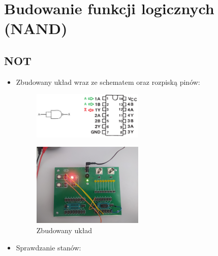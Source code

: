 \chapter{Budowanie funkcji logicznych (NAND)}

    \section{NOT}
        \begin{itemize}
            \item Zbudowany układ wraz ze schematem oraz rozpiską pinów:
                \begin{figure}[H]
                    \centering
                    \includegraphics[width=0.5\textwidth]{img/schemes_with_pins/NAND_not_w_pins.png}
                    \label{NAND:schemat_not_w_pins}
                \end{figure}
                \begin{figure}[H]
                    \centering
                    \includegraphics[width=0.5\textwidth]{img/NAND/funkcje/1652306732632_scaled.png}
                    \caption{Zbudowany układ}
                    \label{NAND:zbudowany_układ_NOT}
                \end{figure}
            \item Sprawdzanie stanów:
                \begin{figure}[H]
                    \centering
                        \begin{subfigure}[h]{0.35\textwidth}

\end{subfigure}
\end{figure}
\end{itemize}
